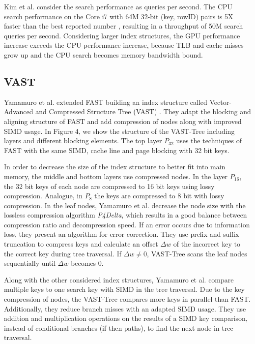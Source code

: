\documentclass[conference]{IEEEtran}
\begin{document}
Kim et al. consider the search performance as queries per second. The CPU search performance on the Core i7 with 64M 32-bit (key, rowID) pairs is 5X faster than the best reported number \cite{b14}, resulting in a throughput of 50M search queries per second. Considering larger index structures, the GPU performance increase exceeds the CPU performance increase, because TLB and cache misses grow up and the CPU search becomes memory bandwidth bound.

\subsection{VAST}\label{SCM}
Yamamuro et al. extended FAST building an index structure called Vector-Advanced and Compressed Structure Tree (VAST) \cite{b5}. They adapt the blocking and aligning structure of FAST and add compression of nodes along with improved SIMD usage. In Figure 4, we show the structure of the VAST-Tree including layers and different blocking elements. The top layer $P_{32}$ uses the techniques of FAST with the same SIMD, cache line and page blocking with 32 bit keys.

In order to decrease the size of the index structure to better fit into main memory, the middle and bottom layers use compressed nodes. In the layer $P_{16}$, the 32 bit keys of each node are compressed to 16 bit keys using lossy compression. Analogue, in $P_8$ the keys are compressed to 8 bit with lossy compression. In the leaf nodes, Yamamuro et al. decrease the node size with the lossless compression algorithm \emph{P4Delta}, which results in a good balance between compression ratio and decompression speed. If an error occurs due to information loss, they present an algorithm for error correction. They use prefix and suffix truncation to compress keys and calculate an offset $\Delta w$ of the incorrect key to the correct key during tree traversal. If $\Delta w\neq0$, VAST-Tree scans the leaf nodes sequentially until $\Delta w$ becomes $0$.

Along with the other considered index structures, Yamamuro et al. compare multiple keys to one search key with SIMD in the tree traversal. Due to the key compression of nodes, the VAST-Tree compares more keys in parallel than FAST. Additionally, they reduce branch misses with an adapted SIMD usage. They use addition and multiplication operations on the results of a SIMD key comparison, instead of conditional branches (if-then paths), to find the next node in tree traversal.
\end{document}
